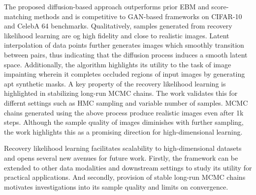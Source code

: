 \documentclass[11pt,letterpaper]{article}
\begin{document}
The proposed diffusion-based approach outperforms prior EBM and score-matching methods and is competitive to GAN-based frameworks on CIFAR-10 and CelebA 64 benchmarks. Qualitatively, samples generated from recovery likelihood learning are og high fidelity and close to realistic images. Latent interpolation of data points further generates images which smoothly transition between pairs, thus indicating that the diffusion process induces a smooth latent space. Additionally, the algorithm highlights its utility to the task of image impainting wherein it completes occluded regions of input images by generating apt synthetic masks. A key property of the recovery likelihood learning is highlighted in stabilizing long-run MCMC chains. The work validates this for differnt settings such as HMC sampling and variable number of samples. MCMC chains generated using the above process produce realistic images even after 1k steps. Although the sample quality of images diminishes with further sampling, the work highlights this as a promising direction for high-dimensional learning. 

Recovery likelihood learning facilitates scalability to high-dimensional datasets and opens several new avenues for future work. Firstly, the framework can be extended to other data modalities and downstream settings to study its utility for practical applications. And secondly, provision of stable long-run MCMC chains motivates investigations into its sample quality and limits on convergence.
\end{document}
